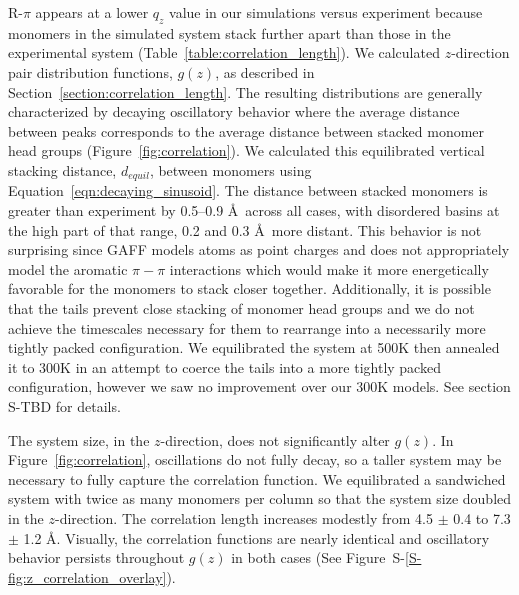 \documentclass[journal=jpcbfk,manuscript=article]{achemso}
\begin{document}

  R-$\pi$ appears at a lower $q_z$ value in our simulations versus experiment because
  monomers in the simulated system stack further apart than those in the experimental
  system (Table~\ref{table:correlation_length}). We calculated $z$-direction pair distribution
  functions, $g(z)$, as described in Section~\ref{section:correlation_length}.
  The resulting distributions are generally characterized
  by decaying oscillatory behavior where the average distance between peaks corresponds
  to the average distance between stacked monomer head groups (Figure~\ref{fig:correlation}).
  We calculated this equilibrated vertical stacking distance, $\mathit{d}_{equil}$, between
  monomers using Equation~\ref{eqn:decaying_sinusoid}. The distance between stacked
  monomers is greater than experiment by 0.5--0.9 \AA~across all cases, with disordered
  basins at the high part of that range, 0.2 and 0.3 \AA~more distant. This behavior is
  not surprising since GAFF models atoms as point charges and  %
  does not appropriately model the aromatic $\pi-\pi$ interactions which would make it
  more energetically favorable for the monomers to stack closer together. Additionally, 
  it is possible that the tails prevent close stacking of monomer head groups and we do
  not achieve the timescales necessary for them to rearrange into a necessarily more
  tightly packed configuration. We equilibrated the system at 500K then annealed it to 300K
  in an attempt to coerce the tails into a more tightly packed configuration, however 
  we saw no improvement over our 300K models. See section S-TBD for details.
  
  The system size, in the $z$-direction, does not significantly alter $g(z)$. 
  In Figure~\ref{fig:correlation}, oscillations do not fully decay, so a taller
  system may be necessary to fully capture the correlation function. We 
  equilibrated a sandwiched system with twice as many monomers per column 
  so that the system size doubled in the $z$-direction. The correlation length 
  increases modestly from 4.5 $\pm$ 0.4 to 7.3 $\pm$ 1.2 \AA. Visually, the
  correlation functions are nearly identical and oscillatory behavior persists
  throughout $g(z)$ in both cases (See Figure~S-\ref{S-fig:z_correlation_overlay}).
\end{document}
